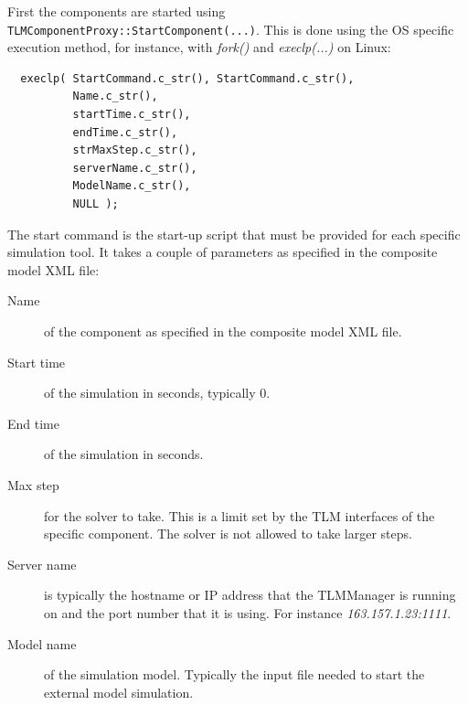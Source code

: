 First the components are started using {\tt TLMComponentProxy::StartComponent(...)}. 
This is done using the OS specific execution method, for instance, with {\it fork()} and {\it execlp(...)} on Linux:
{\scriptsize
\begin{verbatim}
  execlp( StartCommand.c_str(), StartCommand.c_str(),
          Name.c_str(),
          startTime.c_str(),
          endTime.c_str(),
          strMaxStep.c_str(),
          serverName.c_str(),
          ModelName.c_str(),
          NULL );
\end{verbatim}
}

The start command is the start-up script that must be provided for each specific simulation tool. 
It takes a couple of parameters as specified in the composite model XML file:
\begin{description}
\item[Name] of the component as specified in the composite model XML file.
\item[Start time] of the simulation in seconds, typically 0.
\item[End time] of the simulation in seconds.
\item[Max step] for the solver to take. This is a limit set by the TLM interfaces of the specific component. 
The solver is not allowed to take larger steps.
\item[Server name] is typically the hostname or IP address that the TLMManager is running on and the port number that it is using. 
For  instance {\it 163.157.1.23:1111}.
\item[Model name] of the simulation model. Typically the input file
  needed to start the external model simulation.
\end{description}

